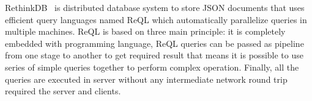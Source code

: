 RethinkDB~\cite{rethindb} is distributed database system to store  JSON documents that uses efficient query languages named ReQL which automatically parallelize queries in multiple machines. ReQL is based on three main principle: it is completely embedded with programming language, ReQL queries can be passed as pipeline from one stage to another to get required result that means it is possible to use series of simple queries together to perform complex operation. Finally, all the queries are executed in server without any intermediate network round trip required the server and clients. 